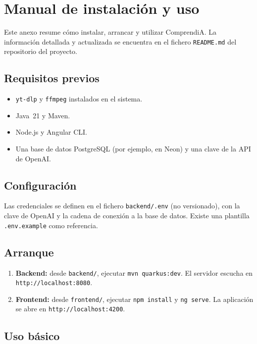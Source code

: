 \chapter{Manual de instalación y uso}
\label{anexo:manual}

Este anexo resume cómo instalar, arrancar y utilizar ComprendiA. La información detallada y
actualizada se encuentra en el fichero \texttt{README.md} del repositorio del proyecto.

\section{Requisitos previos}

\begin{itemize}
  \item \texttt{yt-dlp} y \texttt{ffmpeg} instalados en el sistema.
  \item Java~21 y Maven.
  \item Node.js y Angular CLI.
  \item Una base de datos PostgreSQL (por ejemplo, en Neon) y una clave de la API de OpenAI.
\end{itemize}

\section{Configuración}

Las credenciales se definen en el fichero \texttt{backend/.env} (no versionado), con la clave de
OpenAI y la cadena de conexión a la base de datos. Existe una plantilla \texttt{.env.example} como
referencia.

\section{Arranque}

\begin{enumerate}
  \item \textbf{Backend:} desde \texttt{backend/}, ejecutar \texttt{mvn quarkus:dev}. El servidor
        escucha en \texttt{http://localhost:8080}.
  \item \textbf{Frontend:} desde \texttt{frontend/}, ejecutar \texttt{npm install} y \texttt{ng
        serve}. La aplicación se abre en \texttt{http://localhost:4200}.
\end{enumerate}

\section{Uso básico}

